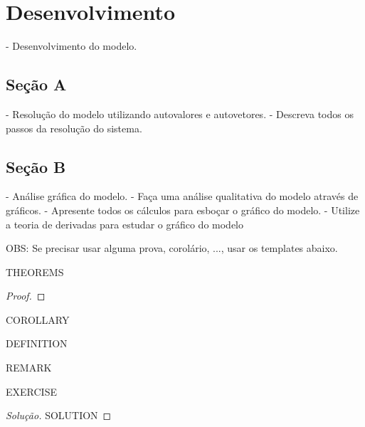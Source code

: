 \section{Desenvolvimento}

- Desenvolvimento do modelo.

\subsection{Seção A}

- Resolução do modelo utilizando autovalores e autovetores.
- Descreva todos os passos da resolução do sistema.


\subsection{Seção B}

- Análise gráfica do modelo.
- Faça uma análise qualitativa do modelo através de gráficos. 
- Apresente todos os cálculos para esboçar o gráfico do modelo. 
- Utilize a teoria de derivadas para estudar o gráfico do modelo


OBS: Se precisar usar alguma prova, corolário, ..., usar os templates abaixo.

\begin{theorem}
THEOREMS
\end{theorem}
\begin{proof}
\end{proof}
\begin{corollary}
COROLLARY
\end{corollary}
\begin{definition}
DEFINITION
\end{definition}
\begin{remark}
REMARK
\end{remark}
\begin{exercise}
EXERCISE
\end{exercise}
\begin{proof}[Solução]
SOLUTION
\end{proof}
\clearpage